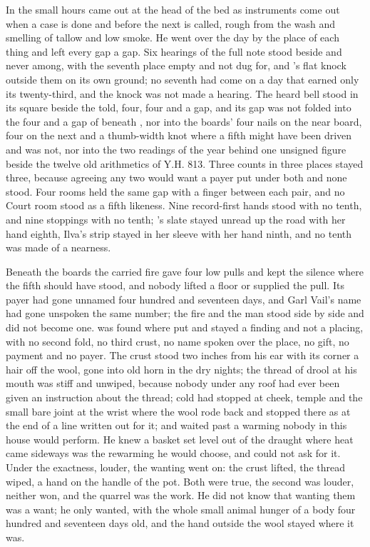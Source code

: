 In the small hours  came out at the head of the bed as instruments come out when a case is done and before the next is called, rough from the wash and smelling of tallow and low smoke. He went over the day by the place of each thing and left every gap a gap. Six hearings of the full note stood beside and never among, with the seventh place empty and not dug for, and 's flat knock outside them on its own ground; no seventh had come on a day that earned only its twenty-third, and the knock was not made a hearing. The heard bell stood in its square beside the told, four, four and a gap, and its gap was not folded into the four and a gap of  beneath , nor into the boards' four nails on the near board, four on the next and a thumb-width knot where a fifth might have been driven and was not, nor into the two readings of the year behind one unsigned figure beside the twelve old arithmetics of Y.H. 813. Three counts in three places stayed three, because agreeing any two would want a payer put under both and none stood. Four rooms held the same gap with a finger between each pair, and no Court room stood as a fifth likeness. Nine record-first hands stood with no tenth, and nine stoppings with no tenth; 's slate stayed unread up the road with her hand eighth, Ilva's strip stayed in her sleeve with her hand ninth, and no tenth was made of a nearness.

Beneath the boards the carried fire gave four low pulls and kept the silence where the fifth should have stood, and nobody lifted a floor or supplied the pull. Its payer had gone unnamed four hundred and seventeen days, and Garl Vail's name had gone unspoken the same number; the fire and the man stood side by side and did not become one.  was found where put and stayed a finding and not a placing, with no second fold, no third crust, no name spoken over the place, no gift, no payment and no payer. The crust stood two inches from his ear with its corner a hair off the wool, gone into old horn in the dry nights; the thread of drool at his mouth was stiff and unwiped, because nobody under any roof had ever been given an instruction about the thread; cold had stopped at cheek, temple and the small bare joint at the wrist where the wool rode back and stopped there as at the end of a line written out for it; and  waited past a warming nobody in this house would perform. He knew a basket set level out of the draught where heat came sideways was the rewarming he would choose, and could not ask for it. Under the exactness, louder, the wanting went on: the crust lifted, the thread wiped, a hand on the handle of the pot. Both were true, the second was louder, neither won, and the quarrel was the work. He did not know that wanting them was a want; he only wanted, with the whole small animal hunger of a body four hundred and seventeen days old, and the hand outside the wool stayed where it was.


